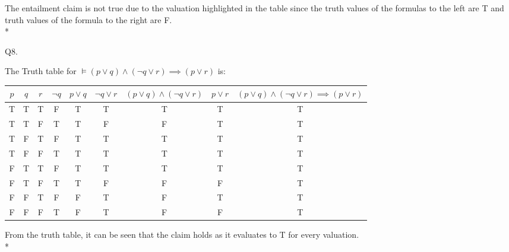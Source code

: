\documentclass[12pt]{article}
\begin{document}
The entailment claim is not true due to the valuation highlighted in the table since the truth values of the formulas to the left are T and truth values of the formula to the right are F.
\\*


Q8.

The Truth table for $\models (p \lor q) \land (\neg q \lor r) \implies (p \lor r)$ is:

\begin{center}
	\begin{tabular}{|c c c | c | c | c | c | c | c |}
	\hline
	$p$ & $q$ & $r$  & $\neg q$ &$ p \lor q$ & $\neg q \lor r $  & $(p \lor q) \land (\neg q \lor r)$ & $p \lor r$ & $(p \lor q) \land (\neg q \lor r) \implies (p \lor r)$\\ \hline
	
	T & T & T & F & T & T & T & T & T\\ \hline
	T & T & F & T & T & F & F & T & T\\ \hline
	T & F & T & F & T & T & T & T & T\\ \hline
	T & F & F & T & T & T & T & T & T\\ \hline
	F & T & T & F & T & T & T & T & T\\ \hline
	F & T & F & T & T & F & F & F & T\\ \hline
	F & F & T & F & F & T & F & T & T\\ \hline
	F & F & F & T & F & T & F & F & T\\ \hline

\end{tabular}
	\end{center}
From the truth table, it can be seen that the claim holds as it evaluates to T for every valuation.
\\*
\end{document}
